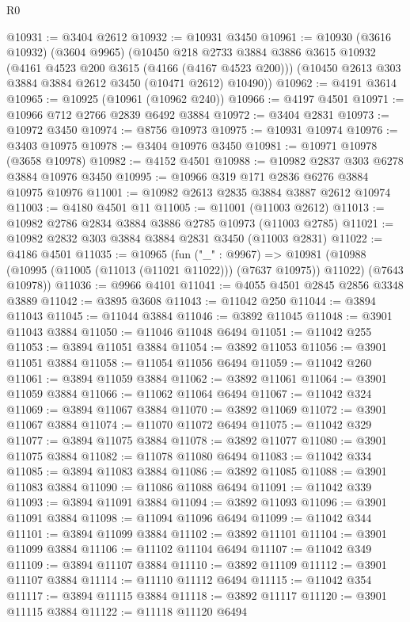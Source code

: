 \begin{lexlean}{R0}
\begin{coremodule}
@10931 := @3404 @2612
@10932 := @10931 @3450
@10961 := @10930
    (@3616 @10932)
    (@3604 @9965)
    (@10450
      @218
      @2733
      @3884
      @3886
      @3615
      @10932
      (@4161 @4523 @200 @3615 (@4166 (@4167 @4523 @200)))
      (@10450 @2613 @303 @3884 @3884 @2612 @3450 (@10471 @2612) @10490))
@10962 := @4191 @3614
@10965 := @10925 (@10961 (@10962 @240))
@10966 := @4197 @4501
@10971 := @10966 @712 @2766 @2839 @6492 @3884
@10972 := @3404 @2831
@10973 := @10972 @3450
@10974 := @8756 @10973
@10975 := @10931 @10974
@10976 := @3403 @10975
@10978 := @3404 @10976 @3450
@10981 := @10971 @10978 (@3658 @10978)
@10982 := @4152 @4501
@10988 := @10982 @2837 @303 @6278 @3884 @10976 @3450
@10995 := @10966 @319 @171 @2836 @6276 @3884 @10975 @10976
@11001 := @10982 @2613 @2835 @3884 @3887 @2612 @10974
@11003 := @4180 @4501 @11
@11005 := @11001 (@11003 @2612)
@11013 := @10982 @2786 @2834 @3884 @3886 @2785 @10973 (@11003 @2785)
@11021 := @10982 @2832 @303 @3884 @3884 @2831 @3450 (@11003 @2831)
@11022 := @4186 @4501
@11035 := @10965
    (fun ("_" : @9967) =>
    @10981 (@10988 (@10995 (@11005 (@11013 (@11021 @11022))) (@7637 @10975)) @11022) (@7643 @10978))
@11036 := @9966 @4101
@11041 := @4055 @4501 @2845 @2856 @3348 @3889
@11042 := @3895 @3608
@11043 := @11042 @250
@11044 := @3894 @11043
@11045 := @11044 @3884
@11046 := @3892 @11045
@11048 := @3901 @11043 @3884
@11050 := @11046 @11048 @6494
@11051 := @11042 @255
@11053 := @3894 @11051 @3884
@11054 := @3892 @11053
@11056 := @3901 @11051 @3884
@11058 := @11054 @11056 @6494
@11059 := @11042 @260
@11061 := @3894 @11059 @3884
@11062 := @3892 @11061
@11064 := @3901 @11059 @3884
@11066 := @11062 @11064 @6494
@11067 := @11042 @324
@11069 := @3894 @11067 @3884
@11070 := @3892 @11069
@11072 := @3901 @11067 @3884
@11074 := @11070 @11072 @6494
@11075 := @11042 @329
@11077 := @3894 @11075 @3884
@11078 := @3892 @11077
@11080 := @3901 @11075 @3884
@11082 := @11078 @11080 @6494
@11083 := @11042 @334
@11085 := @3894 @11083 @3884
@11086 := @3892 @11085
@11088 := @3901 @11083 @3884
@11090 := @11086 @11088 @6494
@11091 := @11042 @339
@11093 := @3894 @11091 @3884
@11094 := @3892 @11093
@11096 := @3901 @11091 @3884
@11098 := @11094 @11096 @6494
@11099 := @11042 @344
@11101 := @3894 @11099 @3884
@11102 := @3892 @11101
@11104 := @3901 @11099 @3884
@11106 := @11102 @11104 @6494
@11107 := @11042 @349
@11109 := @3894 @11107 @3884
@11110 := @3892 @11109
@11112 := @3901 @11107 @3884
@11114 := @11110 @11112 @6494
@11115 := @11042 @354
@11117 := @3894 @11115 @3884
@11118 := @3892 @11117
@11120 := @3901 @11115 @3884
@11122 := @11118 @11120 @6494

\end{coremodule}
\end{lexlean}
